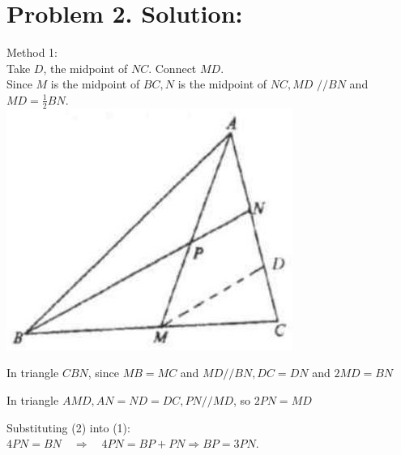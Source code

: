 \documentclass[10pt]{article}
\begin{document}
\section*{Problem 2. Solution:}
Method 1:\\
Take \(D\), the midpoint of \(N C\). Connect \(M D\).\\
Since \(M\) is the midpoint of \(B C, N\) is the midpoint of \(N C, M D\) \(/ / B N\) and \(M D=\frac{1}{2} B N\).\\
\includegraphics[max width=\textwidth, center]{2025_04_17_97bc1f7e44d93c271a88g-047}

In triangle \(C B N\), since \(M B=M C\) and \(M D / / B N, D C=D N\) and \(2 M D=B N\)

In triangle \(A M D, A N=N D=D C, P N / / M D\), so \(2 P N=M D\)

Substituting (2) into (1):\\
\(4 P N=B N \quad \Rightarrow \quad 4 P N=B P+P N \Rightarrow B P=3 P N\).
\end{document}

